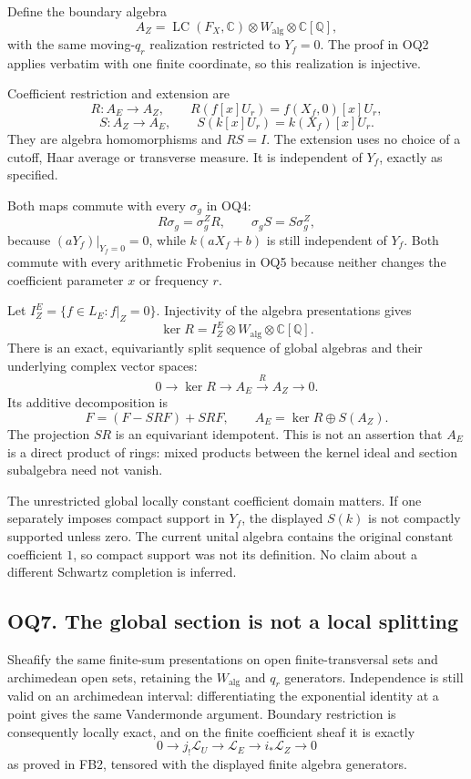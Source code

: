 Define the boundary algebra \[
A_Z=\operatorname{LC}(F_X,\mathbb C)\otimes W_{\mathrm{alg}}
\otimes\mathbb C[\mathbb Q],
\tag{OQ6.1}
\] with the same moving-\(q_r\) realization restricted to \(Y_f=0\). The
proof in OQ2 applies verbatim with one finite coordinate, so this
realization is injective.

Coefficient restriction and extension are \[
R:A_E\longrightarrow A_Z,\qquad
R(f[x]U_r)=f(X_f,0)[x]U_r,
\] \[
\boxed{S:A_Z\longrightarrow A_E,\qquad
S(k[x]U_r)=k(X_f)[x]U_r.}
\tag{OQ6.2}
\] They are algebra homomorphisms and \(RS=I\). The extension uses no
choice of a cutoff, Haar average or transverse measure. It is
independent of \(Y_f\), exactly as specified.

Both maps commute with every \(\sigma_g\) in OQ4: \[
R\sigma_g=\sigma_g^Z R,\qquad
\sigma_gS=S\sigma_g^Z,
\tag{OQ6.3}
\] because \((aY_f)|_{Y_f=0}=0\), while \(k(aX_f+b)\) is still
independent of \(Y_f\). Both commute with every arithmetic Frobenius in
OQ5 because neither changes the coefficient parameter \(x\) or frequency
\(r\).

Let \(I_Z^E=\{f\in L_E:f|_Z=0\}\). Injectivity of the algebra
presentations gives \[
\ker R=I_Z^E\otimes W_{\mathrm{alg}}\otimes\mathbb C[\mathbb Q].
\tag{OQ6.4}
\] There is an exact, equivariantly split sequence of global algebras
and their underlying complex vector spaces: \[
0\longrightarrow\ker R
\longrightarrow A_E
\xrightarrow{R}A_Z
\longrightarrow0.
\tag{OQ6.5}
\] Its additive decomposition is \[
F=(F-SRF)+SRF,\qquad
A_E=\ker R\oplus S(A_Z).
\tag{OQ6.6}
\] The projection \(SR\) is an equivariant idempotent. This is not an
assertion that \(A_E\) is a direct product of rings: mixed products
between the kernel ideal and section subalgebra need not vanish.

The unrestricted global locally constant coefficient domain matters. If
one separately imposes compact support in \(Y_f\), the displayed
\(S(k)\) is not compactly supported unless zero. The current unital
algebra contains the original constant coefficient \(1\), so compact
support was not its definition. No claim about a different Schwartz
completion is inferred.

\subsection{OQ7. The global section is not a local
splitting}\label{oq7.-the-global-section-is-not-a-local-splitting}

Sheafify the same finite-sum presentations on open finite-transversal
sets and archimedean open sets, retaining the \(W_{\mathrm{alg}}\) and
\(q_r\) generators. Independence is still valid on an archimedean
interval: differentiating the exponential identity at a point gives the
same Vandermonde argument. Boundary restriction is consequently locally
exact, and on the finite coefficient sheaf it is exactly \[
0\longrightarrow j_!\mathscr L_U
\longrightarrow\mathscr L_E
\longrightarrow i_*\mathscr L_Z\longrightarrow0
\tag{OQ7.1}
\] as proved in FB2, tensored with the displayed finite algebra
generators.

